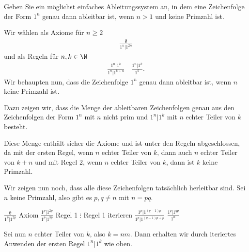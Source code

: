 
\begin{exercise}[58]

Geben Sie ein möglichst einfaches Ableitungssystem an, in dem eine
Zeichenfolge der Form $1^n$ genau dann ableitbar ist, wenn $n > 1$ und keine
Primzahl ist.

\end{exercise}


\begin{solution}
Wir wählen als Axiome für $n \geq 2$
\begin{align*}
  \frac{\emptyset}{1^n|1^{2n}}
\end{align*}
und als Regeln für $n, k \in \N$
\begin{align*}
  \frac{1^n|1^k}{1^n|1^{k+n}} \quad \frac{1^n|1^k}{1^k}.
\end{align*}
Wir behaupten nun, dass die Zeichenfolge $1^n$ genau dann ableitbar ist,
wenn $n$ keine Primzahl ist.

Dazu zeigen wir, dass die Menge der ableitbaren Zeichenfolgen genau aus
den Zeichenfolgen der Form $1^n$ mit $n$ nicht prim und $1^n|1^k$ mit $n$
echter Teiler von $k$ besteht.

Diese Menge enthält sicher die Axiome und ist unter den Regeln abgeschlossen,
da mit der ersten Regel, wenn $n$ echter Teiler von $k$, dann auch $n$
echter Teiler von $k + n$ und mit Regel 2, wenn $n$ echter Teiler von $k$,
dann ist $k$ keine Primzahl.

Wir zeigen nun noch, dass alle diese Zeichenfolgen tatsächlich herleitbar sind.
Sei $n$ keine Primzahl, also gibt es $p, q \neq n$ mit $n = pq$.
\begin{algorithmic}
  \State $\frac{\emptyset}{1^p|1^{2p}}$ \Comment Axiom
  \State $\frac{1^p|1^{2p}}{1^p|1^{3p}}$ \Comment Regel 1
  \State $\vdots$ \Comment Regel 1 iterieren
  \State $\frac{1^p|1^{(q-1)p}}{1^p|1^{(q-1)p + p}}$
  \State $\frac{1^p|1^{qp}}{1^n}$
\end{algorithmic}
Sei nun $n$ echter Teiler von $k$, also $k = nm$.
Dann erhalten wir durch iteriertes Anwenden der ersten Regel $1^n|1^k$ wie oben.
\end{solution}

